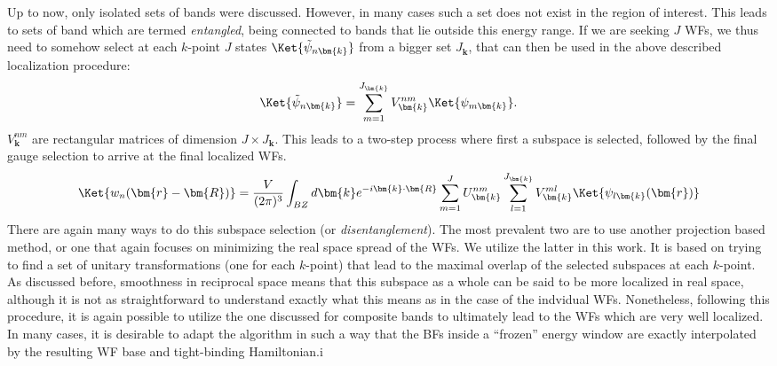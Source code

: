 Up to now, only isolated sets of bands were discussed. However, in many cases such a set does not exist in the region of interest.
This leads to sets of band which are termed {\it entangled},  being connected to bands that lie outside this energy range.
If we are seeking $J$ WFs, we thus need to somehow select at each $k$-point $J$ states $\Ket{\tilde{\psi}_{n\bm{k}}}$ from a bigger set $J_{\bm{k}}$, that can then be used in the above described localization procedure:
\begin{equation}
	\Ket{\tilde{\psi}_{n\bm{k}}} = \sum_{m=1}^{J_{\bm{k}}}V^{nm}_{\bm{k}} \Ket{\psi_{m\bm{k}}}.
\end{equation}
$V^{nm}_{\bm{k}}$ are rectangular matrices of dimension $J\times J_{\bm{k}}$.
This leads to a two-step process where first a subspace is selected, followed by the final gauge selection to arrive at the final localized WFs.
\begin{equation}
	\Ket{w_n(\bm{r}-\bm{R})} = \frac{V}{(2\pi)^3} \int_{BZ} d\bm{k} e^{-i \bm{k} \cdot \bm{R}} \sum_{m=1}^J U^{nm}_{\bm{k}} \sum_{l=1}^{J_{\bm{k}}} V^{ml}_{\bm{k}} \Ket{\psi_{l\bm{k}}(\bm{r})}
\end{equation}
There are again many ways to do this subspace selection (or {\it disentanglement}).
The most prevalent two are to use another projection based method, or one that again focuses on minimizing the real space spread of the WFs.
We utilize the latter in this work.
It is based on trying to find a set of unitary transformations (one for each $k$-point) that lead to the maximal overlap of the selected subspaces at each $k$-point.
As discussed before, smoothness in reciprocal space means that this subspace as a whole can be said to be more localized in real space, although it is not as straightforward to understand exactly what this means as in the case of the indvidual WFs.
Nonetheless, following this procedure, it is again possible to utilize the one discussed for composite bands to ultimately lead to the WFs which are very well localized.
In many cases, it is desirable to adapt the algorithm in such a way that the BFs inside a ``frozen'' energy window are exactly interpolated by the resulting WF base and tight-binding Hamiltonian.i

